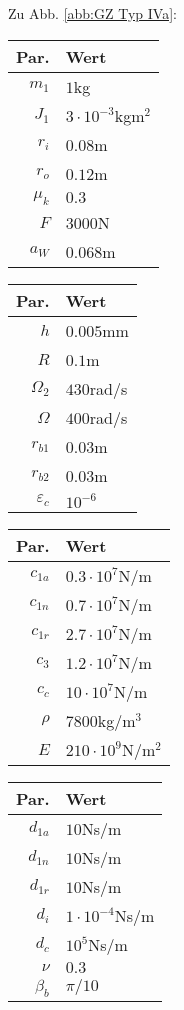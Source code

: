 \newpage
Zu Abb. \ref{abb:GZ Typ IVa}: 
\begin{center}
	\begin{tabular}{r|l}
		Par.&Wert\\\hline
		$m_1$&$1$kg\\
		$J_1$&$3\cdot10^{-3}$kgm$^2$\\
		$r_i$&$0.08$m\\
		$r_o$&$0.12$m\\
		$\mu_k$& $0.3$\\
		$F$&$3000$N\\
		$a_W$&$0.068$m\\
	\end{tabular}\hfill
	\begin{tabular}{r|l}
		Par.&Wert\\\hline
		$h$&$0.005$mm\\
		$R$&$0.1$m\\
		$\Omega_2$&$430$rad/s\\
		$\Omega$& $400$rad/s \\
		$r_{b1}$&$0.03$m\\
		$r_{b2}$&$0.03$m\\
		$\varepsilon_{c}$&$10^{-6}$\\
	\end{tabular}\hfill
	\begin{tabular}{r|l}
		Par.&Wert\\\hline
		$c_{1a}$&$0.3\cdot10^{7}$N/m\\
		$c_{1n}$&$0.7\cdot10^{7}$N/m\\
		$c_{1r}$&$2.7\cdot10^{7}$N/m\\
		$c_{3}$&$1.2\cdot10^{7}$N/m\\
		$c_{c}$&$10\cdot10^{7}$N/m\\
		$\rho$&$7800$kg/m$^3$\\
		$E$&$210\cdot10^9$N/m$^2$\\
	\end{tabular}\hfill
	\begin{tabular}{r|l}
		Par.&Wert\\\hline
		$d_{1a}$&$10$Ns/m\\
		$d_{1n}$&$10$Ns/m\\
		$d_{1r}$&$10$Ns/m\\
		$d_i$ &$1\cdot10^{-4}$Ns/m\\
		$d_c$ &$10^{5}$Ns/m\\
		$\nu$&$0.3$\\
		$\beta_b$&$\pi/10$
	\end{tabular}
\end{center}

